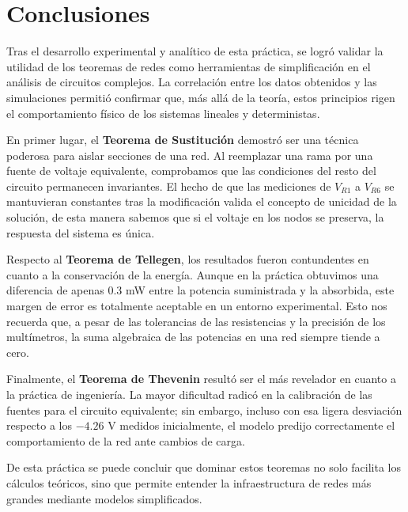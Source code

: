 \section{Conclusiones}

Tras el desarrollo experimental y analítico de esta práctica, se logró validar la utilidad de los teoremas de redes como herramientas de simplificación en el análisis de circuitos complejos. La correlación entre los datos obtenidos y las simulaciones permitió confirmar que, más allá de la teoría, estos principios rigen el comportamiento físico de los sistemas lineales y deterministas.


En primer lugar, el \textbf{Teorema de Sustitución} demostró ser una técnica poderosa para aislar secciones de una red. Al reemplazar una rama por una fuente de voltaje equivalente, comprobamos que las condiciones del resto del circuito permanecen invariantes. El hecho de que las mediciones de $V_{R1}$ a $V_{R6}$ se mantuvieran constantes tras la modificación valida el concepto de unicidad de la solución, de esta manera sabemos que si el voltaje en los nodos se preserva, la respuesta del sistema es única.


Respecto al \textbf{Teorema de Tellegen}, los resultados fueron contundentes en cuanto a la conservación de la energía. Aunque en la práctica obtuvimos una diferencia de apenas $0.3$ mW entre la potencia suministrada y la absorbida, este margen de error es totalmente aceptable en un entorno experimental. Esto nos recuerda que, a pesar de las tolerancias de las resistencias y la precisión de los multímetros, la suma algebraica de las potencias en una red siempre tiende a cero.


Finalmente, el \textbf{Teorema de Thevenin} resultó ser el más revelador en cuanto a la práctica de ingeniería. La mayor dificultad radicó en la calibración de las fuentes para el circuito equivalente; sin embargo, incluso con esa ligera desviación respecto a los $-4.26$ V medidos inicialmente, el modelo predijo correctamente el comportamiento de la red ante cambios de carga.


De esta práctica se puede concluir que dominar estos teoremas no solo facilita los cálculos teóricos, sino que permite entender la infraestructura de redes más grandes mediante modelos simplificados.